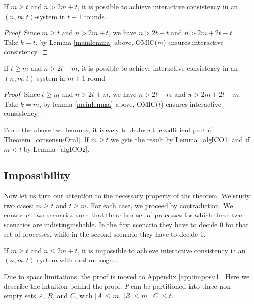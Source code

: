 \begin{lemma}\label{algICO1}
  If $m \geqslant t$ and $n>2m+t$, it is possible to achieve interactive consistency in an $(n,m,t)$-system 
  in $t+1$ rounds.
\end{lemma}

\begin{proof}
  Since $m \geqslant t$ and $n>2m+t$, we have $n>2t+t$ and $n >2m+2t-t$. Take
  $k=t$, by Lemma \ref{mainlemma} above, OMIC($m$) ensures
  interactive consistency. 
\end{proof}

\begin{lemma}\label{algICO2}
  If $t \geqslant m$ and $n>2t+m$, it is possible to achieve interactive consistency in an $(n,m,t)$-system 
 in $m+1$ round.
\end{lemma}

\begin{proof}
  Since $t \geqslant m$ and $n>2t+m$, we have $n>2t+m$ and $n >2m+2t-m$. Take
  $k=m$, by lemma \ref{mainlemma} above, OMIC($t$) ensures
  interactive consistency.
\end{proof}

From the above two lemmas, it is easy to deduce the sufficient part of 
Theorem~\ref{consensusOral}. 
If $m \geqslant t$ we gets the result by Lemma~\ref{algICO1} and  if $m<t$ by Lemma~\ref{algICO2}.



\subsection{Impossibility}

Now let us turn our attention to the necessary property of the theorem. We study two cases: $m \geqslant t$
and $t \geqslant m$. For each case, we proceed by contradiction.
We construct two scenarios such that there is a set of processes for which these two scenarios are indistinguishable. 
In the first scenario they have to decide 0 for that set of processes, while in the second scenario they have to decide 1.






\begin{lemma}\label{imposs:1}
  If $m \geqslant t$ and $n \leqslant 2m+t$, it is impossible to achieve interactive consistency in an $(n,m,t)$-system with oral messages.
  \end{lemma}

Due to space limitations, the proof is moved to Appendix \ref{app:imposs:1}. Here we describe the intuition behind the proof.
  $P$ can be partitioned into three non-empty sets $A$, $B$, and $C$,
  with $| A | \leqslant m$, $| B | \leqslant m$, $| C | \leqslant t$. 
  
